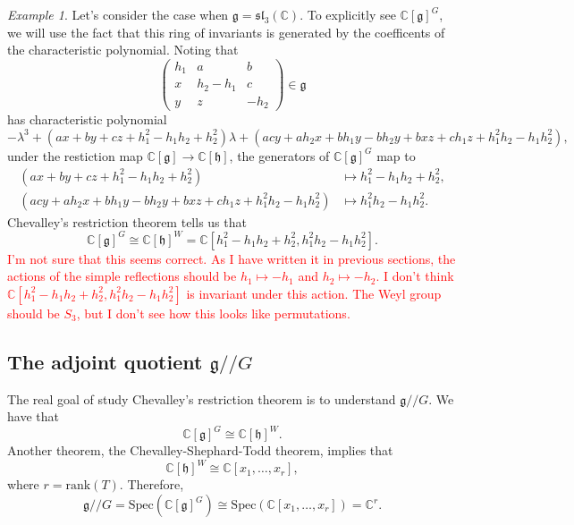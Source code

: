 \documentclass[12pt]{amsart}
\newcommand{\C}{\mathbb{C}}
\newcommand{\g}{\mathfrak{g}}
\newcommand{\h}{\mathfrak{h}}
\newcommand{\git}{/\!\!/}
\theoremstyle{remark}
\theoremstyle{remark}
\newtheorem*{example}{Example}
\theoremstyle{remark}
\begin{document}
\begin{example}
Let's consider the case when $\g = \mathfrak{sl}_3(\C)$.
To explicitly see $\C[\g]^G$, we will use the fact that this ring of invariants is generated by the coefficents of the characteristic polynomial.
Noting that
$$
\begin{pmatrix}
	h_1 & a & b \\
	x & h_2 - h_1 & c \\
	y & z & - h_2
\end{pmatrix} \in \g$$
has characteristic polynomial
$$- \lambda^3 + (ax + by + cz + h_1^2 - h_1 h_2 + h_2^2) \lambda 
+( acy + ah_2x + bh_1y - bh_2y + bxz + ch_1z + h_1^2h_2 - h_1h_2^2),$$
under the restiction map $\C[\g] \to \C[\h]$, the generators of $\C[\g]^G$ map to 
\begin{align*}
	(ax + by + cz + h_1^2 - h_1 h_2 + h_2^2) &\mapsto h_1^2 - h_1 h_2 + h_2^2, \\
	(acy + ah_2x + bh_1y - bh_2y + bxz + ch_1z + h_1^2h_2 - h_1h_2^2) &\mapsto h_1^2 h_2 - h_1 h_2^2.
\end{align*}
Chevalley's restriction theorem tells us that
$$\C[\g]^G \cong \C[\h]^W = \C[h_1^2 - h_1 h_2 + h_2^2, h_1^2 h_2 - h_1 h_2^2].$$
\textcolor{red}{
I'm not sure that this seems correct.
As I have written it in previous sections, the actions of the simple reflections should be $h_1 \mapsto - h_1$ and $h_2 \mapsto - h_2$.
I don't think $\C[h_1^2 - h_1 h_2 + h_2^2, h_1^2 h_2 - h_1 h_2^2]$ is invariant under this action.
The Weyl group should be $S_3$, but I don't see how this looks like permutations.
}
\end{example}

\subsection{The adjoint quotient $\g\git G$}
The real goal of study Chevalley's restriction theorem is to understand $\g \git G$.
We have that 
$$\C[\g]^G \cong \C[\h]^W.$$
Another theorem, the Chevalley-Shephard-Todd theorem, implies that
$$\C[\h]^W \cong \C[x_1, \ldots, x_r],$$
where $r = \mathrm{rank}(T)$.
Therefore, 
$$\g \git G = \mathrm{Spec}(\C[\g]^G) \cong \mathrm{Spec}(\C[x_1, \ldots, x_r]) = \C^r.$$
\end{document}
